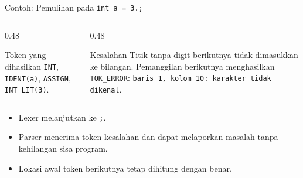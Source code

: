 \documentclass[aspectratio=169,10pt,t]{beamer}
\begin{document}
\begin{frame}{Contoh: Pemulihan pada \texttt{int a = 3.;}}
  \begin{columns}[T,onlytextwidth]
    \begin{column}{0.48\textwidth}
      \begin{block}{Token yang dihasilkan}
        \footnotesize
        \texttt{INT}, \texttt{IDENT(a)}, \texttt{ASSIGN},
        \texttt{INT\_LIT(3)}.
      \end{block}
    \end{column}
    \begin{column}{0.48\textwidth}
      \begin{block}{Kesalahan}
        \footnotesize
        Titik tanpa digit berikutnya tidak dimasukkan ke bilangan.
        Pemanggilan berikutnya menghasilkan \texttt{TOK\_ERROR}:
        \texttt{baris 1, kolom 10: karakter tidak dikenal}.
      \end{block}
    \end{column}
  \end{columns}

  \vspace{4pt}
  \begin{itemize}
    \item Lexer melanjutkan ke \texttt{;}.
    \item Parser menerima token kesalahan dan dapat melaporkan masalah
          tanpa kehilangan sisa program.
    \item Lokasi awal token berikutnya tetap dihitung dengan benar.
  \end{itemize}
\end{frame}
\end{document}
